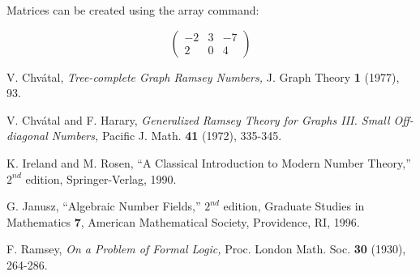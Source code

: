 \documentclass[10pt]{amsart}
\begin{document}
Matrices can be created using the array command:

$$\left( \begin{array}{rrr} -2 & 3 & -7 \\ 2 & 0 & 4 \end{array} \right)$$


\begin{thebibliography}{10}

 V. Chv\'atal, {\it Tree-complete Graph Ramsey Numbers,}  J. Graph Theory {\bf 1} (1977), 93.

 V. Chv\'atal and F. Harary, {\it Generalized Ramsey Theory for Graphs III. Small Off-diagonal Numbers,} Pacific J. Math. {\bf 41} (1972), 335-345.

 K. Ireland and M. Rosen, ``A Classical
Introduction to Modern Number Theory,'' $2^{nd}$ edition,
Springer-Verlag, 1990.

 G. Janusz, ``Algebraic Number Fields,'' $2^{nd}$ edition, Graduate Studies in Mathematics {\bf 7}, American Mathematical Society, Providence, RI, 1996.

 F. Ramsey, {\it On a Problem of Formal Logic,} Proc. London Math. Soc. {\bf 30} (1930), 264-286.



\end{thebibliography}
\end{document}
